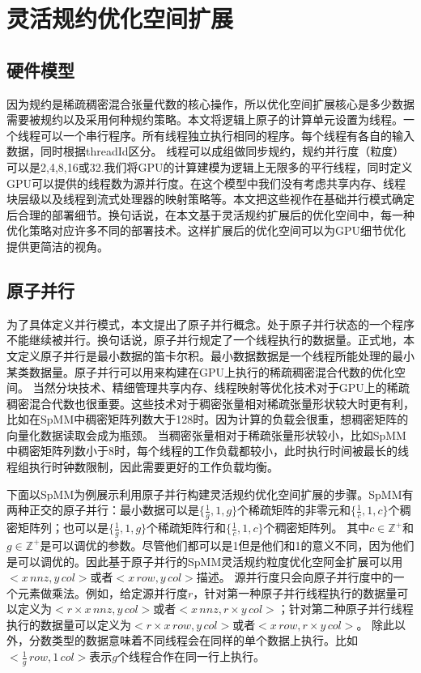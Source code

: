 \section{灵活规约优化空间扩展}
\subsection{硬件模型}
因为规约是稀疏稠密混合张量代数的核心操作，所以优化空间扩展核心是多少数据需要被规约以及采用何种规约策略。本文将逻辑上原子的计算单元设置为线程。一个线程可以一个串行程序。所有线程独立执行相同的程序。每个线程有各自的输入数据，同时根据threadId区分。
线程可以成组做同步规约，规约并行度（粒度）可以是2,4,8,16或32.我们将GPU的计算建模为逻辑上无限多的平行线程，同时定义GPU可以提供的线程数为源并行度。在这个模型中我们没有考虑共享内存、线程块层级以及线程到流式处理器的映射策略等。本文把这些视作在基础并行模式确定后合理的部署细节。换句话说，在本文基于灵活规约扩展后的优化空间中，每一种优化策略对应许多不同的部署技术。这样扩展后的优化空间可以为GPU细节优化提供更简洁的视角。
\subsection{原子并行}
为了具体定义并行模式，本文提出了原子并行概念。处于原子并行状态的一个程序不能继续被并行。换句话说，原子并行规定了一个线程执行的数据量。正式地，本文定义原子并行是最小数据的笛卡尔积。最小数据数据是一个线程所能处理的最小某类数据量。原子并行可以用来构建在GPU上执行的稀疏稠密混合代数的优化空间。
当然分块技术、精细管理共享内存、线程映射等优化技术对于GPU上的稀疏稠密混合代数也很重要\cite{hidayetouglu2020scale,mehrabi2021learning,xin2021fast,gale2020sparse}。这些技术对于稠密张量相对稀疏张量形状较大时更有利，比如在SpMM中稠密矩阵列数大于128时。因为计算的负载会很重，想稠密矩阵的向量化数据读取会成为瓶颈。
当稠密张量相对于稀疏张量形状较小，比如SpMM中稠密矩阵列数小于8时，每个线程的工作负载都较小，此时执行时间被最长的线程组执行时钟数限制，因此需要更好的工作负载均衡。

下面以SpMM为例展示利用原子并行构建灵活规约优化空间扩展的步骤。SpMM有两种正交的原子并行：最小数据可以是$\{\frac{1}{g},1,g\}$个稀疏矩阵的非零元和$\{\frac{1}{c},1,c\}$个稠密矩阵列；也可以是$\{\frac{1}{g},1,g\}$个稀疏矩阵行和$\{\frac{1}{c},1,c\}$个稠密矩阵列。
其中$c\in \mathbb{Z^+}$和$g\in \mathbb{Z^+}$是可以调优的参数。尽管他们都可以是1但是他们和1的意义不同，因为他们是可以调优的。因此基于原子并行的SpMM灵活规约粒度优化空阿金扩展可以用$<x\,nnz , y\,col>$或者$<x\,row, y\,col>$描述。
源并行度只会向原子并行度中的一个元素做乘法。例如，给定源并行度$r$，针对第一种原子并行线程执行的数据量可以定义为$<r \times x\,nnz , y\,col>$或者$<x\,nnz, r \times y\,col>$；针对第二种原子并行线程执行的数据量可以定义为$<r \times x\,row , y\,col>$或者$<x\,row, r \times y\,col>$。
除此以外，分数类型的数据意味着不同线程会在同样的单个数据上执行。比如$<\frac{1}{g}\, row, 1\, col>$表示$g$个线程合作在同一行上执行。
